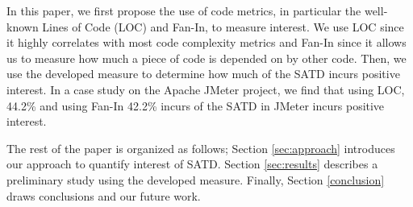 In this paper, we first propose the use of code metrics, in particular the well-known Lines of Code (LOC) and Fan-In, to measure interest. We use LOC since it highly correlates with most code complexity metrics and Fan-In since it allows us to measure how much a piece of code is depended on by other code. Then, we use the developed measure to determine how much of the SATD incurs positive interest. In a case study on the Apache JMeter project, we find that using LOC, 44.2\% and using Fan-In 42.2\% incurs of the SATD in JMeter incurs positive interest.

The rest of the paper is organized as follows; Section \ref{sec:approach} introduces our approach to quantify interest of SATD. Section \ref{sec:results} describes a preliminary study using the developed measure. Finally, Section \ref{conclusion} draws conclusions and our future work.
